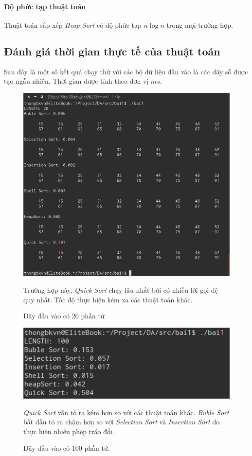 \documentclass[8pt, a4paper]{article}
\begin{document}
\paragraph{Độ phức tạp thuật toán}
Thuật toán sắp xếp \emph{Heap Sort} có độ phức tạp $n \log n $ trong mọi trường hợp.


\subsection{Đánh giá thời gian thực tế của thuật toán}Sau đây là một số kết quả chạy thử với các bộ dữ liệu đầu vào là các dãy sỗ được tạo ngẫu nhiên. Thời gian được tính theo đơn vị $ms$. 

\begin{figure}[htp]
\begin{center}
\includegraphics[scale=0.50]{img/bai1_20.png}
\caption{Dãy đầu vào có 20 phần tử}
\label{}
\end{center}
Trường hợp này, \emph{Quick Sort} chạy lâu nhất bởi có nhiều lời gọi đệ quy nhất. Tốc độ thực hiện kém xa các thuật toán khác.
\end{figure}

\begin{figure}[htp]
\begin{center}
\includegraphics[scale=0.5]{img/bai1_100.png}
\caption{Dãy đầu vào có 100 phần tử.}
\label{}
\end{center}
\emph{Quick Sort} vẫn tỏ ra kém hơn so với các thuật toán khác. \emph{Buble Sort} bắt đầu tỏ ra chậm hơn so với \emph{Selection Sort} và \emph{Insertion Sort} do thực hiện nhiều phép tráo đổi.
\end{figure}
\end{document}
